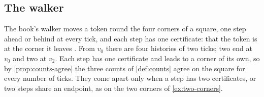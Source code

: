 \documentclass[11pt]{article}
\numberwithin{equation}{section}
\theoremstyle{definition}
\theoremstyle{plain}
\theoremstyle{remark}
\begin{document}
\subsection{The walker}\label{sec:walker}

The book's walker moves a token round the four corners of a square, one step
ahead or behind at every tick, and each step has one certificate: that the
token is at the corner it leaves \cite[Def.~5.9]{Book}.  From \(v_0\) there are
four histories of two ticks; two end at \(v_0\) and two at \(v_2\).  Each
step has one certificate and leads to a corner of its own, so by
\cref{prop:counts-agree} the three counts of \cref{def:counts} agree on the
square for every number of ticks.  They come apart only when a step has two
certificates, or two steps share an endpoint, as on the two corners of
\cref{ex:two-corners}.
\end{document}

